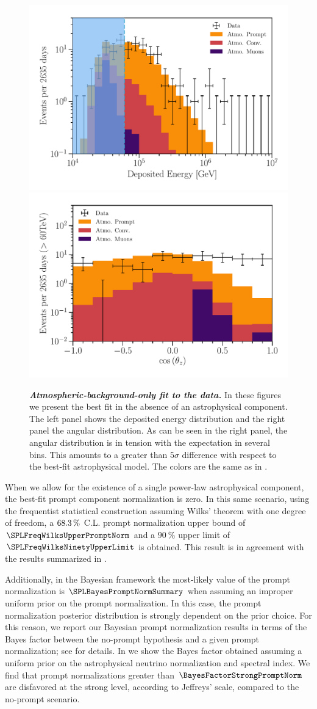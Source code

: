 \begin{figure}
	\centering
	\includegraphics[width=0.45\linewidth]{figures/hese_paper/prompt_only_diffuse_energy_projection_all.pdf}
	\includegraphics[width=0.45\linewidth]{figures/hese_paper/prompt_only_diffuse_zenith_projection_all.pdf}
	\internallinenumbers
	\caption{\textbf{\textit{Atmospheric-background-only fit to the data.}} In these figures we present the best fit in the absence of an astrophysical component.
		The left panel shows the deposited energy distribution and the right panel the angular distribution.
		As can be seen in the right panel, the angular distribution is in tension with the expectation in several bins.
		This amounts to a greater than $5\sigma$ difference with respect to the best-fit astrophysical model.
		The colors are the same as in .}\label{fig:prompt_no_astro}
\end{figure}

When we allow for the existence of a single power-law astrophysical component, the best-fit prompt component normalization is zero.
In this same scenario, using the frequentist statistical construction assuming Wilks' theorem with one degree of freedom, a $\SI{68.3}\percent$ C.L. prompt normalization upper bound of $\SPLFreqWilksUpperPromptNorm$ and a $\SI{90}\percent$ upper limit of $\SPLFreqWilksNinetyUpperLimit$ is obtained.
This result is in agreement with the results summarized in .

Additionally, in the Bayesian framework the most-likely value of the prompt normalization is $\SPLBayesPromptNormSummary$ when assuming an improper uniform prior on the prompt normalization.
In this case, the prompt normalization posterior distribution is strongly dependent on the prior choice.
For this reason, we report our Bayesian prompt normalization results in terms of the Bayes factor between the no-prompt hypothesis and a given prompt normalization; see  for details.
In  we show the Bayes factor obtained assuming a uniform prior on the astrophysical neutrino normalization and spectral index.
We find that prompt normalizations greater than $\BayesFactorStrongPromptNorm$ are disfavored at the strong level, according to Jeffreys' scale, compared to the no-prompt scenario.

